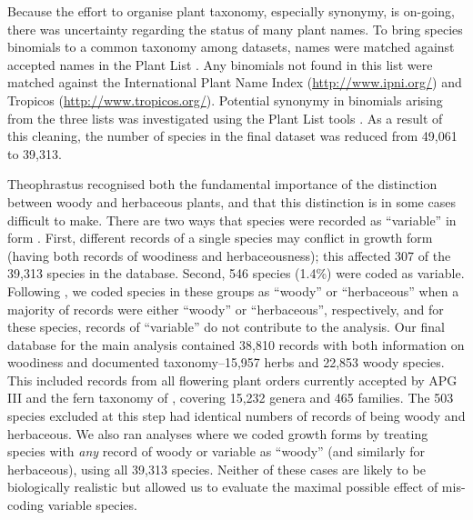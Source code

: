 Because the effort to organise plant taxonomy, especially synonymy, is
on-going, there was uncertainty regarding the status of many plant
names.
%
To bring species binomials to a common taxonomy among datasets, names
were matched against accepted names in the Plant List
\citep{ThePlantList}.  Any binomials not found in this list were
matched against the International Plant Name Index
(\url{http://www.ipni.org/}) and Tropicos (\url{http://www.tropicos.org/}).
Potential synonymy in binomials arising from the three lists was
investigated using the Plant List tools \citep{ThePlantList}.  
As a result of this cleaning, the number of species in the final
dataset was reduced from 49,061 to 39,313.

Theophrastus recognised both the fundamental importance of the
distinction between woody and herbaceous plants, and that this
distinction is in some cases difficult to make.  There are two ways
that species were recorded as ``variable'' in form
\citep{Beaulieu2013}.  First, different records of a single
species may conflict in growth form (having both records of woodiness
and herbaceousness); this affected 307 of the 39,313 species in the
database.
Second, 546 species (1.4\%) were coded as variable.
Following \citet{Beaulieu2013}, we coded species in these
groups as ``woody'' or ``herbaceous'' when a majority of records were
either ``woody'' or ``herbaceous'', respectively, and for these
species, records of ``variable'' do not contribute to the analysis.
%
%
Our final database for the main analysis contained 38,810 records with
both information on woodiness and documented taxonomy--15,957 herbs
and 22,853 woody species.  
This included records from all flowering plant orders currently
accepted by APG III \citep{APG3} and the fern taxonomy of
\citet{apweb}, covering 15,232 genera and 465 families.
The 503 species excluded at this step had identical numbers of records
of being woody and herbaceous.
We also ran analyses where we coded growth forms by treating species
with \emph{any} record of woody or variable as ``woody'' (and
similarly for herbaceous), using all 39,313 species.  Neither of these
cases are likely to be biologically realistic but allowed us to
evaluate the maximal possible effect of mis-coding variable species.

